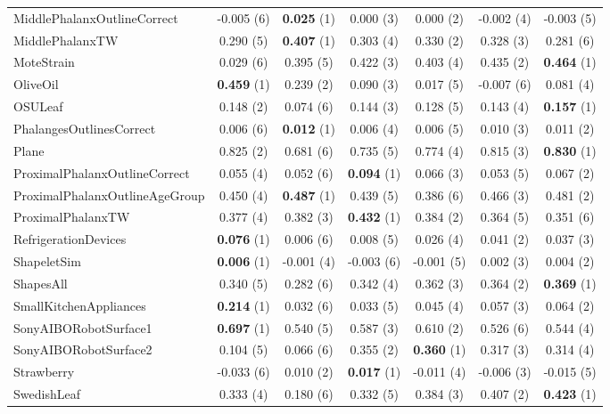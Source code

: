 \begin{table}[ht]
\begin{adjustbox}{width=\textwidth}
\begin{tabular}{lcccccc}
    MiddlePhalanxOutlineCorrect & -0.005 (6) & \textbf{0.025} (1) & 0.000 (3) & 0.000 (2) & -0.002 (4) & -0.003 (5) \\
    MiddlePhalanxTW & 0.290 (5) & \textbf{0.407} (1) & 0.303 (4) & 0.330 (2) & 0.328 (3) & 0.281 (6) \\
    MoteStrain & 0.029 (6) & 0.395 (5) & 0.422 (3) & 0.403 (4) & 0.435 (2) & \textbf{0.464} (1) \\
    OliveOil & \textbf{0.459} (1) & 0.239 (2) & 0.090 (3) & 0.017 (5) & -0.007 (6) & 0.081 (4) \\
    OSULeaf & 0.148 (2) & 0.074 (6) & 0.144 (3) & 0.128 (5) & 0.143 (4) & \textbf{0.157} (1) \\
    PhalangesOutlinesCorrect & 0.006 (6) & \textbf{0.012} (1) & 0.006 (4) & 0.006 (5) & 0.010 (3) & 0.011 (2) \\
    Plane & 0.825 (2) & 0.681 (6) & 0.735 (5) & 0.774 (4) & 0.815 (3) & \textbf{0.830} (1) \\
    ProximalPhalanxOutlineCorrect & 0.055 (4) & 0.052 (6) & \textbf{0.094} (1) & 0.066 (3) & 0.053 (5) & 0.067 (2) \\
    ProximalPhalanxOutlineAgeGroup & 0.450 (4) & \textbf{0.487} (1) & 0.439 (5) & 0.386 (6) & 0.466 (3) & 0.481 (2) \\
    ProximalPhalanxTW & 0.377 (4) & 0.382 (3) & \textbf{0.432} (1) & 0.384 (2) & 0.364 (5) & 0.351 (6) \\
    RefrigerationDevices & \textbf{0.076} (1) & 0.006 (6) & 0.008 (5) & 0.026 (4) & 0.041 (2) & 0.037 (3) \\
    ShapeletSim & \textbf{0.006} (1) & -0.001 (4) & -0.003 (6) & -0.001 (5) & 0.002 (3) & 0.004 (2) \\
    ShapesAll & 0.340 (5) & 0.282 (6) & 0.342 (4) & 0.362 (3) & 0.364 (2) & \textbf{0.369} (1) \\
    SmallKitchenAppliances & \textbf{0.214} (1) & 0.032 (6) & 0.033 (5) & 0.045 (4) & 0.057 (3) & 0.064 (2) \\
    SonyAIBORobotSurface1 & \textbf{0.697} (1) & 0.540 (5) & 0.587 (3) & 0.610 (2) & 0.526 (6) & 0.544 (4) \\
    SonyAIBORobotSurface2 & 0.104 (5) & 0.066 (6) & 0.355 (2) & \textbf{0.360} (1) & 0.317 (3) & 0.314 (4) \\
    Strawberry & -0.033 (6) & 0.010 (2) & \textbf{0.017} (1) & -0.011 (4) & -0.006 (3) & -0.015 (5) \\
    SwedishLeaf & 0.333 (4) & 0.180 (6) & 0.332 (5) & 0.384 (3) & 0.407 (2) & \textbf{0.423} (1) \\

\end{tabular}
\end{adjustbox}
\end{table}
